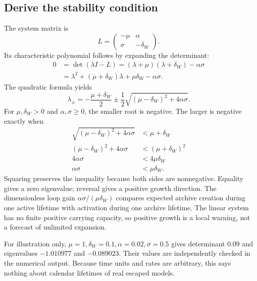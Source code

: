 \documentclass[11pt]{article}
\begin{document}
\subsection{Derive the stability condition}
The system matrix is
\begin{equation}
L=\begin{pmatrix}-\mu&\alpha\\\sigma&-\delta_W\end{pmatrix}.
\end{equation}
Its characteristic polynomial follows by expanding the determinant:
\begin{align}
0&=\det(\lambda I-L)=(\lambda+\mu)(\lambda+\delta_W)-\alpha\sigma\\
&=\lambda^2+(\mu+\delta_W)\lambda+\mu\delta_W-\alpha\sigma.
\end{align}
The quadratic formula yields
\begin{equation}\label{eq:eigen}
\lambda_\pm=-\frac{\mu+\delta_W}{2}
\pm\frac12\sqrt{(\mu-\delta_W)^2+4\alpha\sigma}.
\end{equation}
For $\mu,\delta_W>0$ and $\alpha,\sigma\ge0$, the smaller root is negative. The larger is negative exactly when
\begin{align}
\sqrt{(\mu-\delta_W)^2+4\alpha\sigma}&<\mu+\delta_W\\
(\mu-\delta_W)^2+4\alpha\sigma&<(\mu+\delta_W)^2\\
4\alpha\sigma&<4\mu\delta_W\\
\alpha\sigma&<\mu\delta_W.
\end{align}
Squaring preserves the inequality because both sides are nonnegative. Equality gives a zero eigenvalue; reversal gives a positive growth direction. The dimensionless loop gain $\alpha\sigma/(\mu\delta_W)$ compares expected archive creation during one active lifetime with activation during one archive lifetime. The linear system has no finite positive carrying capacity, so positive growth is a local warning, not a forecast of unlimited expansion.

For illustration only, $\mu=1,\delta_W=0.1,\alpha=0.02,\sigma=0.5$ gives determinant $0.09$ and eigenvalues $-1.010977$ and $-0.089023$. Their values are independently checked in the numerical output. Because time units and rates are arbitrary, this says nothing about calendar lifetimes of real escaped models.
\end{document}

